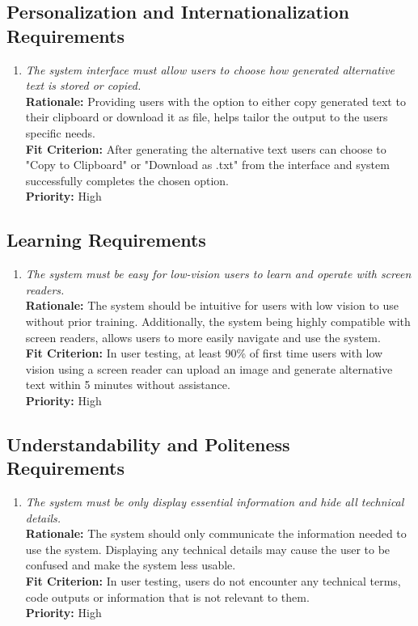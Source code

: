 \documentclass[12pt]{article}
\begin{document}
\subsection{Personalization and Internationalization Requirements}
\begin{enumerate}[label=UHR-PIR \arabic*., wide=0pt, leftmargin=*]
\item \emph{The system interface must allow users to choose how generated alternative text is stored or copied.}\\[2mm] 
    {\bf Rationale:} Providing users with the option to either copy generated text to their clipboard or download it as file, helps tailor the output to the users specific needs.  \\
    {\bf Fit Criterion:} After generating the alternative text users can choose to "Copy to Clipboard" or "Download as .txt" from the interface and system successfully completes the chosen option.\\
    {\bf Priority:} High
\end{enumerate}


\subsection{Learning Requirements}
\begin{enumerate}[label=UHR-LR \arabic*., wide=0pt, leftmargin=*]
\item \emph{The system must be easy for low-vision users to learn and operate with screen readers.}\\[2mm] 
    {\bf Rationale:} The system should be intuitive for users with low vision to use without prior training. Additionally, the system being highly compatible with screen readers, allows users to more easily navigate and use the system.  \\
    {\bf Fit Criterion:} In user testing, at least 90\% of first time users with low vision using a screen reader can upload an image and generate alternative text within 5 minutes without assistance. \\
    {\bf Priority:} High
\end{enumerate}


\subsection{Understandability and Politeness Requirements}
\begin{enumerate}[label=UHR-LR \arabic*., wide=0pt, leftmargin=*]
\item \emph{The system must be only display essential information and hide all technical details.}\\[2mm] 
    {\bf Rationale:} The system should only communicate the information needed to use the system. Displaying any technical details may cause the user to be confused and make the system less usable.   \\
    {\bf Fit Criterion:} In user testing, users do not encounter any technical terms, code outputs or information that is not relevant to them.  \\
    {\bf Priority:} High
\end{enumerate}
\end{document}
